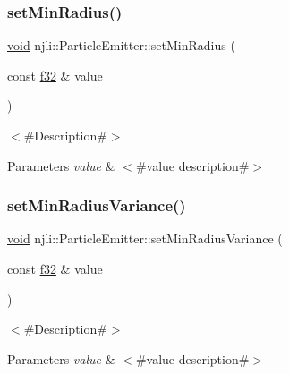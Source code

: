 \subsubsection{\texorpdfstring{set\+Min\+Radius()}{setMinRadius()}}
{\footnotesize\ttfamily \mbox{\hyperlink{_thread_8h_af1e856da2e658414cb2456cb6f7ebc66}{void}} njli\+::\+Particle\+Emitter\+::set\+Min\+Radius (\begin{DoxyParamCaption}\item[{const \mbox{\hyperlink{_util_8h_a5f6906312a689f27d70e9d086649d3fd}{f32}} \&}]{value }\end{DoxyParamCaption})}

$<$\#\+Description\#$>$


\begin{DoxyParams}{Parameters}
{\em value} & $<$\#value description\#$>$ \\
\hline
\end{DoxyParams}
\mbox{\label{classnjli_1_1_particle_emitter_a3d582b35d0c86cf39c81b1b0db876fc9}} 
\subsubsection{\texorpdfstring{set\+Min\+Radius\+Variance()}{setMinRadiusVariance()}}
{\footnotesize\ttfamily \mbox{\hyperlink{_thread_8h_af1e856da2e658414cb2456cb6f7ebc66}{void}} njli\+::\+Particle\+Emitter\+::set\+Min\+Radius\+Variance (\begin{DoxyParamCaption}\item[{const \mbox{\hyperlink{_util_8h_a5f6906312a689f27d70e9d086649d3fd}{f32}} \&}]{value }\end{DoxyParamCaption})}

$<$\#\+Description\#$>$


\begin{DoxyParams}{Parameters}
{\em value} & $<$\#value description\#$>$ \\
\hline
\end{DoxyParams}
\mbox{\label{classnjli_1_1_particle_emitter_a087eb5f8d9f51cc476f12f1d10a3cb95}} 
